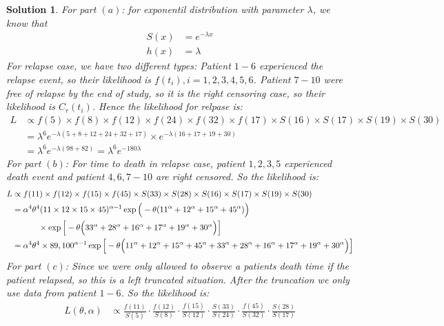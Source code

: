 \documentclass[11pt]{article}
\newtheorem{sol}{Solution}
\begin{document}
\begin{sol}
	For part $(a)$:\vskip 2mm
	for exponentil distribution with parameter $\lambda$, we know that
	\begin{align*}
		S(x) &= e^{-\lambda x}\\
		h(x) &= \lambda
	\end{align*}
	For relapse case, we have two different types:\vskip 2mm
	Patient $1-6$ experienced the relapse event, so their likelihood is $f(t_i), i = 1, 2, 3, 4, 5, 6$. Patient $7-10$ were free of relapse by the end of study, so it is the right censoring case, so their likelihood is $C_r(t_i)$. Hence the likelihood for relpase is:
	\begin{align*}
		L &\propto f(5)\times f(8) \times f(12) \times f(24) \times f(32) \times f(17) \times S(16) \times S(17) \times S(19) \times S(30)\\
		&= \lambda^6 e^{-\lambda(5 + 8 + 12 + 24 + 32 + 17)} \times e^{-\lambda(16 + 17 + 19 + 30)}\\
		&= \lambda^6 e^{-\lambda(98 + 82)} = \lambda^6 e^{-180\lambda}
	\end{align*}
	For part $(b)$:\vskip 2mm
	For time to death in relapse case, patient $1, 2, 3, 5$ experienced death event and patient $4, 6, 7-10$ are right censored.\vskip 2mm
	So the likelihood is:
	\begin{align*}
		L &\propto f(11) \times f(12) \times f(15) \times f(45) \times S(33) \times S(28) \times S(16) \times S(17) \times S(19) \times S(30) \\
		&= \alpha^4\theta^4(11 \times 12 \times 15 \times 45 )^{\alpha - 1}\exp\Big(-\theta(11^{\alpha} +12^{\alpha} + 15^{\alpha} + 45^{\alpha})\Big)\\
		&\ \hskip 1cm \times \exp\Big[-\theta\Big(33^{\alpha} + 28^{\alpha} + 16^{\alpha} + 17^{\alpha} + 19^{\alpha} + 30^{\alpha}\Big)\Big]\\
		&= \alpha^4\theta^4 \times 89,100^{\alpha - 1}\exp\Big[-\theta\Big(11^{\alpha} +12^{\alpha} + 15^{\alpha} + 45^{\alpha} + 33^{\alpha} + 28^{\alpha} + 16^{\alpha} + 17^{\alpha} + 19^{\alpha} + 30^{\alpha}\Big)\Big]
	\end{align*}
	For part $(c)$:\vskip 2mm
	Since we were only allowed to observe a patients death time if the patient relapsed, so this is a left truncated situation.\vskip 2mm
	After the truncation we only use data from patient $1-6$.\vskip 2mm
	So the likelihood is:
	\begin{align*}
		L(\theta, \alpha) &\propto \frac{f(11)}{S(5)}\cdot \frac{f(12)}{S(8)}\cdot \frac{f(15)}{S(12)}\cdot \frac{S(33)}{S(24)}\cdot \frac{f(45)}{S(32)}\cdot \frac{S(28)}{S(17)}\\

\end{align*}
\end{sol}
\end{document}
